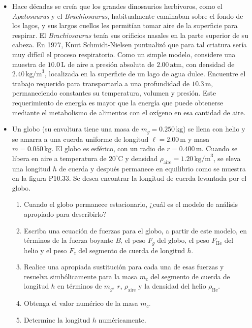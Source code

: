 \documentclass[11pt,a4paper]{article}
\begin{document}
\begin{itemize}
    \item[\textbf{32.}] Hace décadas se creía que los grandes dinosaurios herbívoros, como el \textit{Apatosaurus} y el \textit{Brachiosaurus}, habitualmente caminaban sobre el fondo de los lagos, y sus largos cuellos les permitían tomar aire de la superficie para respirar. El \textit{Brachiosaurus} tenía sus orificios nasales en la parte superior de su cabeza. En 1977, Knut Schmidt-Nielsen puntualizó que para tal criatura sería muy difícil el proceso respiratorio. Como un simple modelo, considere una muestra de \(10.0\,\text{L}\) de aire a presión absoluta de \(2.00\,\text{atm}\), con densidad de \(2.40\,\text{kg/m}^3\), localizada en la superficie de un lago de agua dulce. Encuentre el trabajo requerido para transportarla a una profundidad de \(10.3\,\text{m}\), permaneciendo constantes su temperatura, volumen y presión. Este requerimiento de energía es mayor que la energía que puede obtenerse mediante el metabolismo de alimentos con el oxígeno en esa cantidad de aire.
    \vspace*{7cm}
    
    \item[\textbf{33.}] Un globo (su envoltura tiene una masa de \(m_g = 0.250\,\text{kg}\)) se llena con helio y se amarra a una cuerda uniforme de longitud \(\ell = 2.00\,\text{m}\) y masa \(m = 0.050\,\text{kg}\). El globo es esférico, con un radio de \(r = 0.400\,\text{m}\). Cuando se libera en aire a temperatura de \(20^\circ\text{C}\) y densidad \(\rho_{\text{aire}} = 1.20\,\text{kg/m}^3\), se eleva una longitud \(h\) de cuerda y después permanece en equilibrio como se muestra en la figura P10.33. Se desea encontrar la longitud de cuerda levantada por el globo.
    \begin{enumerate}
        \item Cuando el globo permanece estacionario, ¿cuál es el modelo de análisis apropiado para describirlo?
        \item Escriba una ecuación de fuerzas para el globo, a partir de este modelo, en términos de la fuerza boyante \(B\), el peso \(F_g\) del globo, el peso \(F_{\text{He}}\) del helio y el peso \(F_c\) del segmento de cuerda de longitud \(h\).
        \item Realice una apropiada sustitución para cada una de esas fuerzas y resuelva simbólicamente para la masa \(m_c\) del segmento de cuerda de longitud \(h\) en términos de \(m_g\), \(r\), \(\rho_{\text{aire}}\) y la densidad del helio \(\rho_{\text{He}}\).
        \item Obtenga el valor numérico de la masa \(m_c\).
        \item Determine la longitud \(h\) numéricamente.
    \end{enumerate}
    

\end{itemize}
\end{document}
